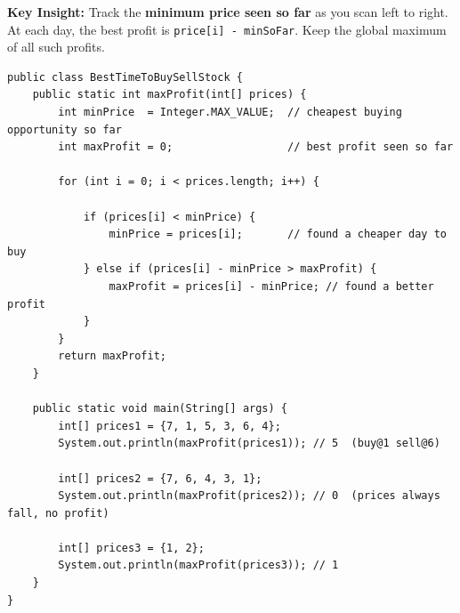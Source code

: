 \documentclass[12pt,a4paper,oneside]{book}
\begin{document}
\begin{center}
\end{center}

\textbf{Key Insight:} Track the \textbf{minimum price seen so far} as you scan left to right. At each day, the best profit is \texttt{price[i] - minSoFar}. Keep the global maximum of all such profits.

\begin{lstlisting}[caption={Best Time to Buy and Sell Stock --- O(n) time O(1) space}]
public class BestTimeToBuySellStock {
    public static int maxProfit(int[] prices) {
        int minPrice  = Integer.MAX_VALUE;  // cheapest buying opportunity so far
        int maxProfit = 0;                  // best profit seen so far

        for (int i = 0; i < prices.length; i++) {

            if (prices[i] < minPrice) {
                minPrice = prices[i];       // found a cheaper day to buy
            } else if (prices[i] - minPrice > maxProfit) {
                maxProfit = prices[i] - minPrice; // found a better profit
            }
        }
        return maxProfit;
    }

    public static void main(String[] args) {
        int[] prices1 = {7, 1, 5, 3, 6, 4};
        System.out.println(maxProfit(prices1)); // 5  (buy@1 sell@6)

        int[] prices2 = {7, 6, 4, 3, 1};
        System.out.println(maxProfit(prices2)); // 0  (prices always fall, no profit)

        int[] prices3 = {1, 2};
        System.out.println(maxProfit(prices3)); // 1
    }
}
\end{lstlisting}
\end{document}
